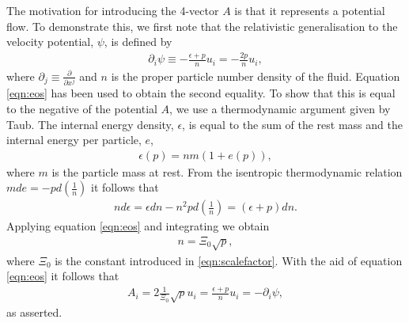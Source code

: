 \documentclass[10pt, fleqn,final,showtrims,oldfontcommands, article,a4paper,oneside]{memoir} %
\newcommand{\eqnref}[1]{\ref{eqn:#1}}
\newcommand{\scalefactor}{\Xi_0}
\newcommand{\lr}[1]{\left( #1 \right)}
\renewcommand{\d}{\partial}
\newcommand{\del}{\nabla}
\begin{document}
The motivation for introducing the 4-vector $A$ is that it represents a potential flow.
To demonstrate this, we first note that the relativistic generalisation to the velocity potential, $\psi$,  is defined\cite{LandauBook} by
\begin{align}
  \d_i \psi \equiv - \frac{\epsilon+p}{n} u_i = - \frac{2 p}{n} u_i,
\end{align}
where $\d_j \equiv \frac{\d}{\d x^j}$ and  $n$ is the proper particle number density of the fluid.
Equation \eqnref{eos} has been used to obtain the second equality.
To show that this is equal to the negative of the potential $A$, we use a thermodynamic argument given by Taub\cite{Taub1978}.
The internal energy density, $\epsilon$, is equal to the sum of the rest mass and the internal energy per particle\cite{LandauBook, Taub1978}, $e$, 
\begin{align}
  \epsilon(p) = nm( 1 + e(p)),
\end{align}
where $m$ is the particle mass at rest.
From the isentropic thermodynamic relation $m de = - p d\lr{\frac{1}{n}}$
it follows that 
\begin{align}
 n d\epsilon = \epsilon dn - n^2 p d \lr{\frac{1}{n}} = \lr{\epsilon + p} dn.
\end{align}
Applying equation \eqnref{eos} and integrating we obtain
\begin{align}
n =\scalefactor \sqrt{   p },
\end{align}
where $\scalefactor$ is the constant introduced in \eqnref{scalefactor}.
With the aid of equation \eqnref{eos} it follows that
\begin{align}
A_i = 2\tfrac{1}{\scalefactor}\sqrt p  u_i =\frac{\epsilon + p}{n} u_i =  -\d_i \psi,
\label{eqn:AisPotFlow}
\end{align}
as asserted.
\end{document}
